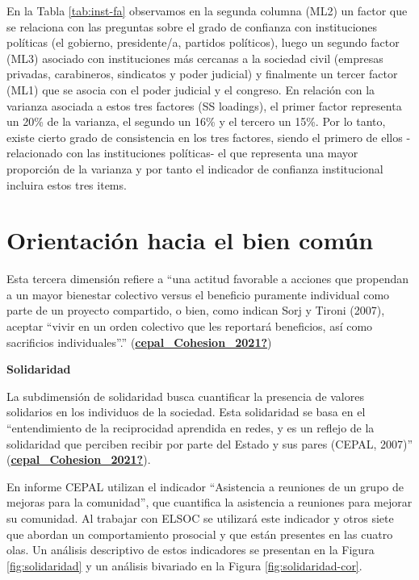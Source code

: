 \documentclass[
  12pt,
]{book}
\begin{document}
En la Tabla \ref{tab:inst-fa} observamos en la segunda columna (ML2) un factor que se relaciona con las preguntas sobre el grado de confianza con instituciones políticas (el gobierno, presidente/a, partidos políticos), luego un segundo factor (ML3) asociado con instituciones más cercanas a la sociedad civil (empresas privadas, carabineros, sindicatos y poder judicial) y finalmente un tercer factor (ML1) que se asocia con el poder judicial y el congreso. En relación con la varianza asociada a estos tres factores (SS loadings), el primer factor representa un 20\% de la varianza, el segundo un 16\% y el tercero un 15\%. Por lo tanto, existe cierto grado de consistencia en los tres factores, siendo el primero de ellos -relacionado con las instituciones políticas- el que representa una mayor proporción de la varianza y por tanto el indicador de confianza institucional incluira estos tres items.

\hypertarget{orientaciuxf3n-hacia-el-bien-comuxfan}{%
\section{Orientación hacia el bien común}\label{orientaciuxf3n-hacia-el-bien-comuxfan}}

Esta tercera dimensión refiere a ``una actitud favorable a acciones que propendan a un mayor bienestar colectivo versus el beneficio puramente individual como parte de un proyecto compartido, o bien, como indican Sorj y Tironi (2007), aceptar ``vivir en un orden colectivo que les reportará beneficios, así como sacrificios individuales''.'' (\protect\hyperlink{ref-cepal_Cohesion_2021}{\textbf{cepal\_Cohesion\_2021?}})

\textbf{Solidaridad}

La subdimensión de solidaridad busca cuantificar la presencia de valores solidarios en los individuos de la sociedad. Esta solidaridad se basa en el ``entendimiento de la reciprocidad aprendida en redes, y es un reflejo de la solidaridad que perciben recibir por parte del Estado y sus pares (CEPAL, 2007)'' (\protect\hyperlink{ref-cepal_Cohesion_2021}{\textbf{cepal\_Cohesion\_2021?}}).

En informe CEPAL utilizan el indicador ``Asistencia a reuniones de un grupo de mejoras para la comunidad'', que cuantifica la asistencia a reuniones para mejorar su comunidad. Al trabajar con ELSOC se utilizará este indicador y otros siete que abordan un comportamiento prosocial y que están presentes en las cuatro olas. Un análisis descriptivo de estos indicadores se presentan en la Figura \ref{fig:solidaridad} y un análisis bivariado en la Figura \ref{fig:solidaridad-cor}.
\end{document}

